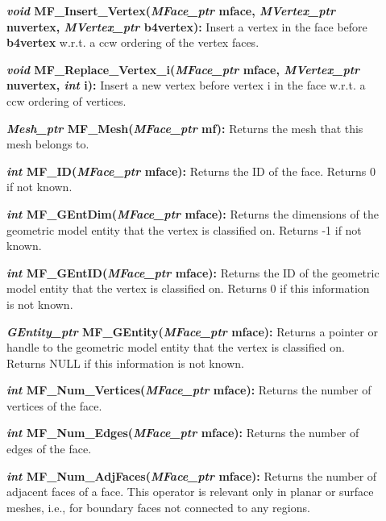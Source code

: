 \documentclass[12pt]{article}
\begin{document}
\begin{description}
\item[]\textbf{\textit{void} MF\_Insert\_Vertex(\textit{MFace\_ptr} mface,
\textit{MVertex\_ptr} nuvertex, \textit{MVertex\_ptr} b4vertex):}
Insert a vertex in the face before \textbf{b4vertex} w.r.t. a ccw
ordering of the vertex faces. 

\item[]\textbf{\textit{void} MF\_Replace\_Vertex\_i(\textit{MFace\_ptr}
mface, \textit{MVertex\_ptr} nuvertex, \textit{int} i):} Insert a new
vertex before vertex i in the face w.r.t. a ccw ordering of vertices.

\item[]

\item[]\textbf{\textit{Mesh\_ptr} MF\_Mesh(\textit{MFace\_ptr} mf):} Returns the mesh that this mesh belongs to.

\item[]\textbf{\textit{int} MF\_ID(\textit{MFace\_ptr} mface):} Returns the ID of the face. Returns 0 if not known.

\item[]\textbf{\textit{int} MF\_GEntDim(\textit{MFace\_ptr} mface):} Returns the dimensions of the geometric model entity that the vertex is classified on. Returns -1 if not known.

\item[]\textbf{\textit{int} MF\_GEntID(\textit{MFace\_ptr} mface):} Returns the ID of the geometric model entity that the vertex is classified on. Returns 0 if this information is not known.

\item[]\textbf{\textit{GEntity\_ptr} MF\_GEntity(\textit{MFace\_ptr} mface):} Returns a pointer or handle to the geometric model entity that the vertex is classified on. Returns NULL if this information is not known.

\item[]

\item[]\textbf{\textit{int} MF\_Num\_Vertices(\textit{MFace\_ptr} mface):} Returns the number of vertices of the face.

\item[]\textbf{\textit{int} MF\_Num\_Edges(\textit{MFace\_ptr} mface):} Returns the number of edges of the face.
  
\item[]\textbf{\textit{int} MF\_Num\_AdjFaces(\textit{MFace\_ptr}
    mface):} Returns the number of adjacent faces of a face. This
  operator is relevant only in planar or surface meshes, i.e., for
  boundary faces not connected to any regions.
  

\end{description}
\end{document}
